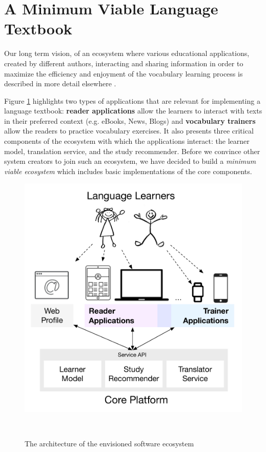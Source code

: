 
\section{A Minimum Viable Language Textbook}
\label{sec:system}

Our long term vision, of an ecosystem where various educational applications, created by different authors, interacting and sharing information in order to maximize the efficiency and enjoyment of the vocabulary learning process is described in more detail elsewhere \cite{Lungu16}. 

Figure \ref{fig:architecture} highlights two types of applications that are relevant for implementing a language textbook: {\bf reader applications} allow the learners to interact with texts in their preferred context (e.g. eBooks, News, Blogs) and {\bf vocabulary trainers} allow the readers to practice vocabulary exercises. It also presents three critical components of the ecosystem with which the applications interact: the learner model, translation service, and the study recommender. Before we convince other system creators to join such an ecosystem, we have decided to build a {\em minimum viable ecosystem} which includes basic implementations of the core components. 

\begin{figure}[h!]
\centering
  \includegraphics[width=\columnwidth]{figures/zeeguu-architecture.pdf}
  \caption{The architecture of the envisioned software ecosystem}~\label{fig:architecture}
\end{figure}


